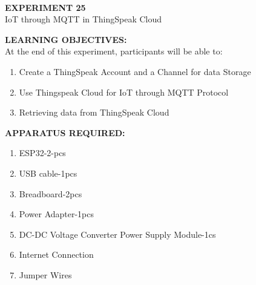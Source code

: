 \documentclass[12pt,a4paper]{article}
\begin{document}
\begin{center}
\textbf{\large \\EXPERIMENT 25 }\\[6pt]
IoT through MQTT in ThingSpeak Cloud
\end{center}

\textbf{\large LEARNING OBJECTIVES:}\\[3pt]
At the end of this experiment, participants will be able to:\vspace{-6mm}\begin{enumerate}
 \setlength\itemsep{-0.3em}
\item  Create a ThingSpeak Account and a Channel for data Storage
\item  Use Thingspeak Cloud for IoT through MQTT Protocol
\item Retrieving data from ThingSpeak Cloud
\end{enumerate}

\textbf{\large APPARATUS REQUIRED:}\\
\vspace{-3mm}
\begin{enumerate}
 \setlength\itemsep{-0.3em}
\item ESP32-2-pcs 
\item USB cable-1pcs
\item Breadboard-2pcs
\item Power Adapter-1pcs 
\item DC-DC Voltage Converter Power Supply Module-1cs
\item Internet Connection
\item Jumper Wires
\end{enumerate}
\end{document}
